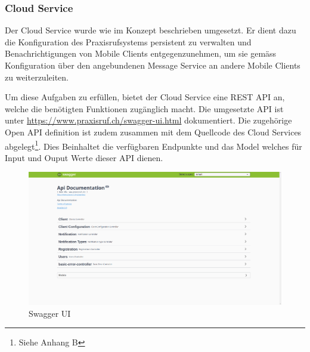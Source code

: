 \subsubsection{Cloud Service}

Der Cloud Service wurde wie im Konzept beschrieben umgesetzt.
Er dient dazu die Konfiguration des Praxisrufsystems persistent zu verwalten und Benachrichtigungen von Mobile Clients entgegenzunehmen, um sie gemäss Konfiguration über den angebundenen Message Service an andere Mobile Clients zu weiterzuleiten.

Um diese Aufgaben zu erfüllen, bietet der Cloud Service eine REST API an, welche die benötigten Funktionen zugänglich macht.
Die umgesetzte API ist unter \url{https://www.praxisruf.ch/swagger-ui.html} dokumentiert.
Die zugehörige Open API definition ist zudem zusammen mit dem Quellcode des Cloud Services abgelegt\footnote{Siehe Anhang B}.
Dies Beinhaltet die verfügbaren Endpunkte und das Model welches für Input und Ouput Werte dieser API dienen.

\begin{figure}[h]
    \begin{minipage}[b]{1\textwidth}
        \includegraphics[width=\textwidth]{graphics/screenshots/cloud/swagger-home}
        \caption{Swagger UI}
    \end{minipage}
    \label{fig:swagger}
\end{figure}
\clearpage
